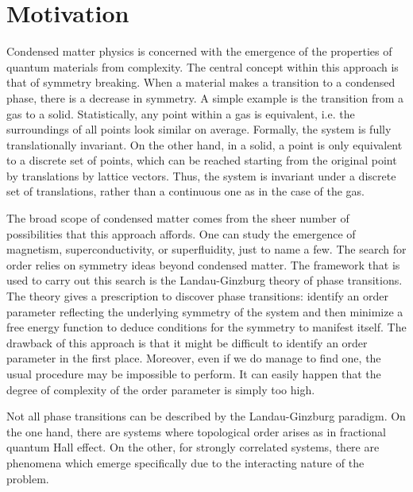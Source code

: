 \section{Motivation}
\label{sec:int_motivation}

Condensed matter physics is concerned with the emergence of the properties of quantum materials from complexity. The central concept within this approach is that of symmetry breaking. When a material makes a transition to a condensed phase, there is a decrease in symmetry. A simple example is the transition from a gas to a solid. Statistically, any point within a gas is equivalent, i.e. the surroundings of all points look similar on average. Formally, the system is fully  translationally invariant. On the other hand, in a solid, a point is only equivalent to a discrete set of points, which can be reached starting from the original point by translations by lattice vectors. Thus, the system is invariant under a discrete set of translations, rather than a continuous one as in the case of the gas.

The broad scope of condensed matter comes from the sheer number of possibilities that this approach affords. One can study the emergence of magnetism, superconductivity, or superfluidity, just to name a few. The search for order relies on symmetry ideas beyond condensed matter. The framework that is used to carry out this search is the Landau-Ginzburg theory of phase transitions. The theory gives a prescription to discover phase transitions: identify an order parameter reflecting the underlying symmetry of the system and then minimize a free energy function to deduce conditions for the symmetry to manifest itself. The drawback of this approach is that it might be difficult to identify an order parameter in the first place. Moreover, even if we do manage to find one, the usual procedure may be impossible to perform. It can easily happen that the degree of complexity of the order parameter is simply too high.

Not all phase transitions can be described by the Landau-Ginzburg paradigm. On the one hand, there are systems where topological order arises as in fractional quantum Hall effect. On the other, for strongly correlated systems, there are phenomena which emerge specifically due to the interacting nature of the problem.